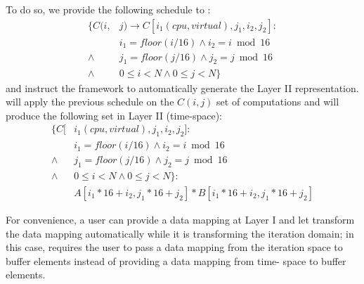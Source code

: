 To do so, we provide the following schedule to \framework:
\begin{align*}
\{C(i,&j)  \rightarrow  C[i_1 (cpu, virtual), j_1, i_2, j_2]: \\
          & i_1=floor(i/16) \wedge i_2=i\bmod 16    \\
          \wedge &  j_1=floor(j/16)  \wedge j_2=j\bmod 16  \\
          \wedge &  0\leq i < N \wedge 0\leq j < N \}
\end{align*}
\noindent and instruct the \framework framework to automatically generate the Layer II representation.  \framework will apply the previous schedule on the $C(i,j)$ set of computations and will produce the following set in Layer II (time-\processor space):
\begin{align*}
\{C[& i_1 (cpu, virtual), j_1, i_2, j_2]:  \\
    & i_1=floor(i/16) \wedge i_2=i\bmod 16 \\
   \wedge &  j_1=floor(j/16) \wedge j_2=j\bmod 16 \\
   \wedge & 0\leq i < N \wedge 0\leq j < N \}:\\
   & A[i_1*16+i_2, j_1*16+j_2] * B[i_1*16+i_2, j_1*16+j_2]
\end{align*}

For convenience, a user can provide a data mapping at Layer I and let \framework transform the data mapping automatically while it is transforming the iteration domain; in this case, \framework requires the user to pass a data mapping from the iteration space to buffer elements instead of providing a data mapping from time-\processor{} space to buffer elements.





